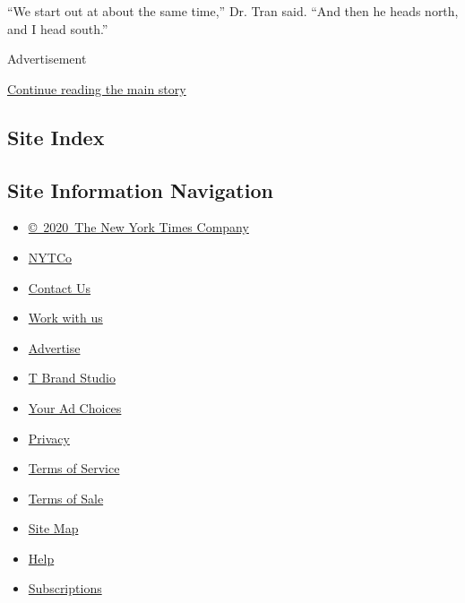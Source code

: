 ``We start out at about the same time,'' Dr. Tran said. ``And then he
heads north, and I head south.''

Advertisement

\protect\hyperlink{after-bottom}{Continue reading the main story}

\hypertarget{site-index}{%
\subsection{Site Index}\label{site-index}}

\hypertarget{site-information-navigation}{%
\subsection{Site Information
Navigation}\label{site-information-navigation}}

\begin{itemize}
\tightlist
\item
  \href{https://help.nytimes3xbfgragh.onion/hc/en-us/articles/115014792127-Copyright-notice}{©~2020~The
  New York Times Company}
\end{itemize}

\begin{itemize}
\tightlist
\item
  \href{https://www.nytco.com/}{NYTCo}
\item
  \href{https://help.nytimes3xbfgragh.onion/hc/en-us/articles/115015385887-Contact-Us}{Contact
  Us}
\item
  \href{https://www.nytco.com/careers/}{Work with us}
\item
  \href{https://nytmediakit.com/}{Advertise}
\item
  \href{http://www.tbrandstudio.com/}{T Brand Studio}
\item
  \href{https://www.nytimes3xbfgragh.onion/privacy/cookie-policy\#how-do-i-manage-trackers}{Your
  Ad Choices}
\item
  \href{https://www.nytimes3xbfgragh.onion/privacy}{Privacy}
\item
  \href{https://help.nytimes3xbfgragh.onion/hc/en-us/articles/115014893428-Terms-of-service}{Terms
  of Service}
\item
  \href{https://help.nytimes3xbfgragh.onion/hc/en-us/articles/115014893968-Terms-of-sale}{Terms
  of Sale}
\item
  \href{https://spiderbites.nytimes3xbfgragh.onion}{Site Map}
\item
  \href{https://help.nytimes3xbfgragh.onion/hc/en-us}{Help}
\item
  \href{https://www.nytimes3xbfgragh.onion/subscription?campaignId=37WXW}{Subscriptions}
\end{itemize}
